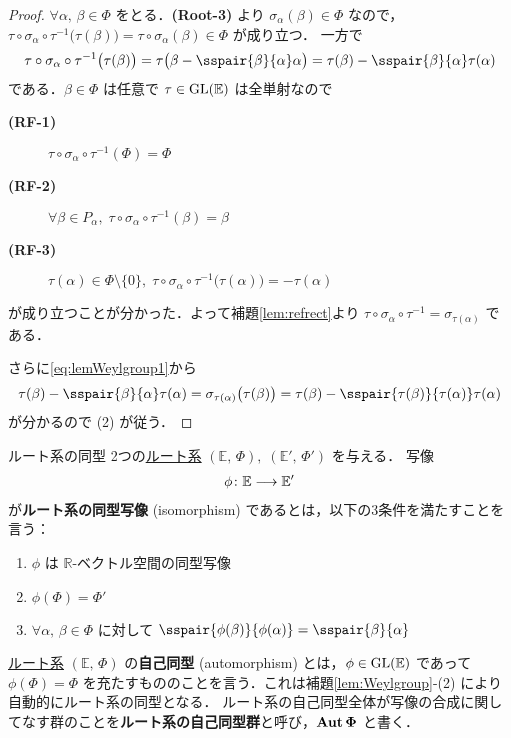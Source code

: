 \documentclass[rep_main]{subfiles}
\begin{document}
\begin{proof}
	$\forall \alpha,\, \beta \in \Phi$ をとる．\textsf{\textbf{(Root-3)}} より $\sigma_\alpha(\beta) \in \Phi$ なので，$\tau \circ \sigma_\alpha \circ \tau^{-1}\bigl(\tau(\beta)\bigr) = \tau \circ \sigma_\alpha(\beta) \in \Phi$ が成り立つ．
	一方で
	\begin{align}
		\label{eq:lemWeylgroup1}
		\tau \circ \sigma_\alpha \circ \tau^{-1}\bigl(\tau(\beta)\bigr) = \tau \bigl( \beta - \sspair{\beta}{\alpha}\alpha \bigr) = \tau(\beta) - \sspair{\beta}{\alpha}\tau(\alpha)
	\end{align}
	である．$\beta \in \Phi$ は任意で $\tau \in \mathrm{GL}(\mathbb{E})$ は全単射なので 
	\begin{description}
		\item[\textbf{(RF-1)}] $\tau \circ \sigma_\alpha \circ \tau^{-1} (\Phi) = \Phi$
		\item[\textbf{(RF-2)}] $\forall \beta \in P_\alpha,\; \tau \circ \sigma_\alpha \circ \tau^{-1}(\beta) = \beta$
		\item[\textbf{(RF-3)}] $\tau(\alpha) \in \Phi \setminus \{0\},\; \tau \circ \sigma_\alpha \circ \tau^{-1} \bigl( \tau(\alpha) \bigr) = -\tau(\alpha)$
	\end{description}
	が成り立つことが分かった．よって補題\ref{lem:refrect}より $\tau \circ \sigma_\alpha \circ \tau^{-1} = \sigma_{\tau(\alpha)}$ である．
	
	さらに\eqref{eq:lemWeylgroup1}から
	\begin{align}
		\tau(\beta) - \sspair{\beta}{\alpha}\tau(\alpha) = \sigma_{\tau(\alpha)} \bigl(\tau(\beta)\bigr) = \tau(\beta) - \sspair{\tau(\beta)}{\tau(\alpha)} \tau(\alpha)
	\end{align}
	が分かるので (2) が従う．
\end{proof}

\begin{mydef}[label=def:isom-root]{ルート系の同型}
	2つの\hyperref[ax:root-system]{ルート系} $(\mathbb{E},\, \Phi),\; (\mathbb{E}',\, \Phi')$ を与える．
	写像
	\begin{align}
		\phi \colon \mathbb{E} \longrightarrow \mathbb{E}'
	\end{align}
	が\textbf{ルート系の同型写像} (isomorphism) であるとは，以下の3条件を満たすことを言う：
	\begin{enumerate}
		\item $\phi$ は $\mathbb{R}$-ベクトル空間の同型写像
		\item $\phi(\Phi) = \Phi'$
		\item $\forall \alpha,\, \beta \in \Phi$ に対して $\sspair{\phi(\beta)}{\phi(\alpha)} = \sspair{\beta}{\alpha}$
	\end{enumerate}
	\tcblower
	\hyperref[ax:root-system]{ルート系} $(\mathbb{E},\, \Phi)$ の\textbf{自己同型} (automorphism) とは，$\phi \in \mathrm{GL}(\mathbb{E})$ であって $\phi(\Phi) = \Phi$ を充たすもののことを言う．これは補題\ref{lem:Weylgroup}-(2) により自動的にルート系の同型となる．
	ルート系の自己同型全体が写像の合成に関してなす群のことを\textbf{ルート系の自己同型群}と呼び，$\bm{\Aut \Phi}$ と書く．
\end{mydef}
\end{document}

